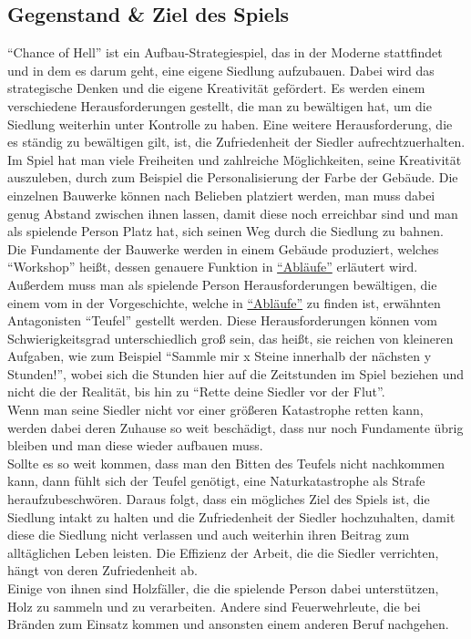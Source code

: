 \documentclass[paper=A4,pagesize=auto,12pt,headinclude=true,footinclude=true,BCOR=0mm,DIV=calc]{scrartcl}
\newcommand{\sectionspace}{
	\vspace{0.5cm}
}
\newcommand{\gametitle}{Chance of Hell}
\begin{document}
\sectionspace
\subsection{Gegenstand \& Ziel des Spiels}\label{sec:Gegenstand}
"`\gametitle"' \space ist ein Aufbau-Strategiespiel, das in der Moderne stattfindet und in dem es darum geht, eine eigene Siedlung aufzubauen. Dabei wird das strategische Denken und die eigene Kreativität gefördert. Es werden einem verschiedene Herausforderungen gestellt, die man zu bewältigen hat, um die Siedlung weiterhin unter Kontrolle zu haben. Eine weitere Herausforderung, die es ständig zu bewältigen gilt, ist, die Zufriedenheit der Siedler aufrechtzuerhalten. \\
Im Spiel hat man viele Freiheiten und zahlreiche Möglichkeiten, seine Kreativität auszuleben, durch zum Beispiel die Personalisierung der Farbe der Gebäude. Die einzelnen Bauwerke können nach Belieben platziert werden, man muss dabei genug Abstand zwischen ihnen lassen, damit diese noch erreichbar sind und man als spielende Person Platz hat, sich seinen Weg durch die Siedlung zu bahnen. \\
Die Fundamente der Bauwerke werden in einem Gebäude produziert, welches "`Workshop"' heißt, dessen genauere Funktion in \hyperref[sec:Ablaeufe]{"`Abläufe"'} erläutert wird.\\
Außerdem muss man als spielende Person Herausforderungen bewältigen, die einem vom in der Vorgeschichte, welche in \hyperref[sec:Ablaeufe]{"`Abläufe"'} zu finden ist, erwähnten Antagonisten "`Teufel"' gestellt werden. Diese Herausforderungen können vom Schwierigkeitsgrad unterschiedlich groß sein, das heißt, sie reichen von kleineren Aufgaben, wie zum Beispiel "`Sammle mir x Steine innerhalb der nächsten y Stunden!"', wobei sich die Stunden hier auf die Zeitstunden im Spiel beziehen und nicht die der Realität, bis hin zu "`Rette deine Siedler vor der Flut"'. \\
Wenn man seine Siedler nicht vor einer größeren Katastrophe retten kann, werden dabei deren Zuhause so weit beschädigt, dass nur noch Fundamente übrig bleiben und man diese wieder aufbauen muss. \\
Sollte es so weit kommen, dass man den Bitten des Teufels nicht nachkommen kann, dann fühlt sich der Teufel genötigt, eine Naturkatastrophe als Strafe heraufzubeschwören.
Daraus folgt, dass ein mögliches Ziel des Spiels ist, die Siedlung intakt zu halten und die %
 Zufriedenheit der Siedler hochzuhalten, damit diese die Siedlung nicht verlassen und auch weiterhin ihren Beitrag zum alltäglichen Leben leisten. Die Effizienz der Arbeit, die die Siedler verrichten, hängt von deren Zufriedenheit ab. \\
Einige von ihnen sind Holzfäller, die die spielende Person dabei unterstützen, Holz zu sammeln und zu verarbeiten. Andere sind Feuerwehrleute, die bei Bränden zum Einsatz kommen und ansonsten einem anderen Beruf nachgehen.
\end{document}
